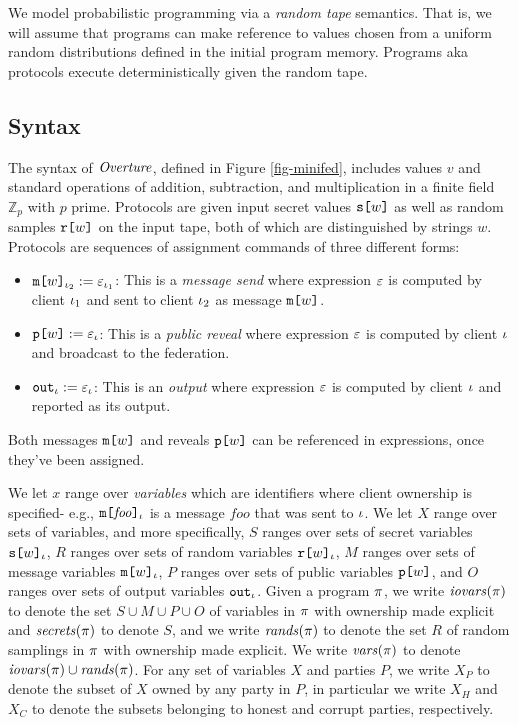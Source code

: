 We model probabilistic programming via a \emph{random tape}
semantics. That is, we will assume that programs can make reference to
values chosen from a uniform random distributions defined in the
initial program memory.  Programs aka protocols execute
deterministically given the random tape.

\subsection{Syntax} The syntax of $\mathit{Overture}$, defined in
Figure \ref{fig-minifed}, includes values $v$ and standard
operations of addition, subtraction, and multiplication in
a finite field $\mathbb{Z}_p$ with $p$ prime. 
Protocols are given input secret values $\texttt{s[}w\texttt{]}$
as well as random samples $\texttt{r[}w\texttt{]}$ on the input
tape, both of which are distinguished by
strings $w$. Protocols are sequences of assignment
commands of three different forms:
\begin{itemize}
\item $\texttt{m[}w\texttt{]}_{\iota_2} := \varepsilon_{\iota_1}$: This
  is a \emph{message send} where expression $\varepsilon$ is computed
  by client $\iota_1$ and sent to client $\iota_2$ as message
  $\texttt{m[}w\texttt{]}$.
\item $\texttt{p[}w\texttt{]} := \varepsilon_{\iota}$: This
  is a \emph{public reveal} where expression $\varepsilon$ is computed
  by client $\iota$ and broadcast to the federation.
\item $\texttt{out}_{\iota} := \varepsilon_{\iota}$: This
  is an \emph{output} where expression $\varepsilon$ is computed
  by client $\iota$ and reported as its output.
\end{itemize}
Both messages $\texttt{m[}w\texttt{]}$ and reveals $\texttt{p[}w\texttt{]}$ can be
referenced in expressions, once they've been assigned.

We let $x$ range over \emph{variables} which are identifiers where
client ownership is specified- e.g.,
$\texttt{m[}\mathit{foo}\texttt{]}_{\iota}$ is a message $\mathit{foo}$ that
was sent to $\iota$. We let $X$ range over sets of variables, and more
specifically, $S$ ranges over sets of secret variables
$\texttt{s[}w\texttt{]}_{\iota}$, $R$ ranges over sets of random variables
$\texttt{r[}w\texttt{]}_{\iota}$, $M$ ranges over sets of message variables
$\texttt{m[}w\texttt{]}_{\iota}$, $P$ ranges over sets of public variables
$\texttt{p[}w\texttt{]}$, and $O$ ranges over sets of output variables $\texttt{out}_{\iota}$.
Given a program $\pi$, we write $\mathit{iovars}(\pi)$ to denote the set $S
\cup M \cup P \cup O$ of variables in $\pi$ with ownership made
explicit and $\mathit{secrets}(\pi)$ to denote $S$, and we write
$\mathit{rands}(\pi)$ to denote the set $R$ of random samplings in $\pi$
with ownership made explicit. We write $\mathit{vars}(\pi)$ to denote
$\mathit{iovars}(\pi) \cup \mathit{rands}(\pi)$. For any set of variables $X$ and
parties $P$, we write $X_P$ to denote the subset of $X$ owned by any
party in $P$, in particular we write $X_H$ and $X_C$ to denote the
subsets belonging to honest and corrupt parties, respectively.

